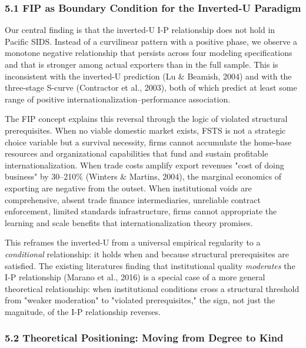 \documentclass[12pt,a4paper]{article}
\begin{document}
\hypertarget{51-fip-as-boundary-condition-for-the-inverted-u-paradigm}{%
\subsubsection{5.1 FIP as Boundary Condition for the Inverted-U
Paradigm}\label{51-fip-as-boundary-condition-for-the-inverted-u-paradigm}}

Our central finding is that the inverted-U I-P relationship does not
hold in Pacific SIDS. Instead of a curvilinear pattern with a positive
phase, we observe a monotone negative relationship that persists across
four modeling specifications and that is stronger among actual exporters
than in the full sample. This is inconsistent with the inverted-U
prediction (Lu \& Beamish, 2004) and with the three-stage S-curve
(Contractor et al., 2003), both of which predict at least some range of
positive internationalization--performance association.

The FIP concept explains this reversal through the logic of violated
structural prerequisites. When no viable domestic market exists, FSTS is
not a strategic choice variable but a survival necessity, firms cannot
accumulate the home-base resources and organizational capabilities that
fund and sustain profitable internationalization. When trade costs
amplify export revenues\textquotesingle{} "cost of doing business" by
30--210\% (Winters \& Martins, 2004), the marginal economics of
exporting are negative from the outset. When institutional voids are
comprehensive, absent trade finance intermediaries, unreliable contract
enforcement, limited standards infrastructure, firms cannot appropriate
the learning and scale benefits that internationalization theory
promises.

This reframes the inverted-U from a universal empirical regularity to a
\emph{conditional} relationship: it holds when and because structural
prerequisites are satisfied. The existing literature\textquotesingle s
finding that institutional quality \emph{moderates} the I-P relationship
(Marano et al., 2016) is a special case of a more general theoretical
relationship: when institutional conditions cross a structural threshold
from "weaker moderation" to "violated prerequisites," the sign, not just
the magnitude, of the I-P relationship reverses.

\hypertarget{52-theoretical-positioning-moving-from-degree-to-kind}{%
\subsubsection{5.2 Theoretical Positioning: Moving from Degree to
Kind}\label{52-theoretical-positioning-moving-from-degree-to-kind}}
\end{document}
